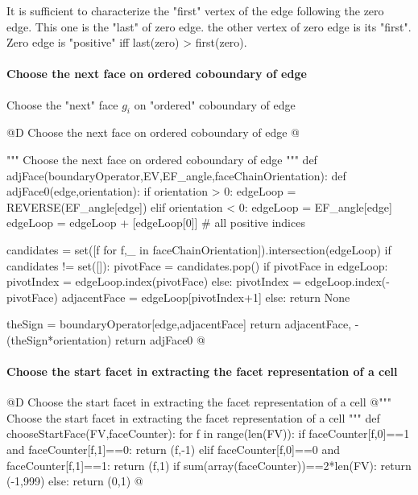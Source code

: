 \documentclass[11pt,oneside]{article}    %
\begin{document}
It is sufficient to characterize the "first" vertex of the edge following the zero edge. This one is the "last" of zero edge. the other vertex of zero edge is its "first". Zero edge is "positive" iff last(zero) > first(zero).


\paragraph{Choose the next face on ordered coboundary of edge}
Choose the "next" face $g_i$  on "ordered" coboundary of edge


@D Choose the next face on ordered coboundary of edge
@{""" Choose the next face on ordered coboundary of edge """
def adjFace(boundaryOperator,EV,EF_angle,faceChainOrientation):
    def adjFace0(edge,orientation):
        if orientation > 0:  edgeLoop = REVERSE(EF_angle[edge])
        elif orientation < 0:  edgeLoop = EF_angle[edge]
        edgeLoop = edgeLoop + [edgeLoop[0]]  # all positive indices
        
        candidates = set([f for f,_ in faceChainOrientation]).intersection(edgeLoop)
        if candidates != set([]):
            pivotFace = candidates.pop()
            if pivotFace in edgeLoop:
                pivotIndex = edgeLoop.index(pivotFace)
            else:
                pivotIndex = edgeLoop.index(-pivotFace)
            adjacentFace = edgeLoop[pivotIndex+1]
        else: return None
        
        theSign = boundaryOperator[edge,adjacentFace]
        return adjacentFace, -(theSign*orientation)
    return adjFace0
@}



\paragraph{Choose the start facet in extracting the facet representation of a cell}
@D Choose the start facet in extracting the facet representation of a cell
@{""" Choose the start facet in extracting the facet representation of a cell """
def chooseStartFace(FV,faceCounter):
    for f in range(len(FV)):
        if faceCounter[f,0]==1 and faceCounter[f,1]==0: return (f,-1)
        elif faceCounter[f,0]==0 and faceCounter[f,1]==1: return (f,1)
    if sum(array(faceCounter))==2*len(FV): return (-1,999)
    else: return (0,1)
@}
\end{document}
